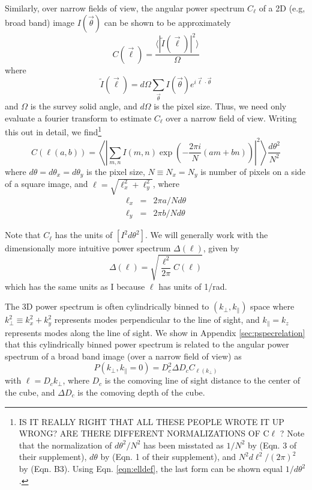 \documentclass{emulateapj}
\begin{document}
Similarly, over narrow fields of view, the angular power spectrum $C_\ell$ of a 2D (e.g, broad band) image $I(\vec{\theta})$ can be shown to be approximately
\begin{equation}
\label{eqn:Cldef0}
	C(\vec{\ell}) = \frac{\langle|\tilde{I}(\vec{\ell})|^2\rangle}{\Omega} 
\end{equation}
where
\begin{equation}
	\tilde{I}(\vec{\ell})=d\Omega\sum_{\vec{\theta}}I(\vec{\theta})e^{i\vec{\ell}\cdot\vec{\theta}}
\end{equation}
and $\Omega$ is the survey solid angle, and $d\Omega$ is the pixel size. Thus, we need only evaluate a fourier transform to estimate $C_\ell$ over a narrow field of view. Writing this out in detail, we find\footnote{IS IT REALLY RIGHT THAT ALL THESE PEOPLE WROTE IT UP WRONG? ARE THERE DIFFERENT NORMALIZATIONS OF C$\ell$ ? Note that the normalization of $d\theta^2/N^2$ has been misstated as $1/N^2$ by \citet{zemcov14} (Eqn. 3 of their supplement), $d\theta$ by \citet{cooray12} (Eqn. 1 of their supplement), and $N^2d\ell^2/(2\pi)^2$ by \citet{thacker15} (Eqn. B3). Using Eqn. \ref{eqn:elldef}, the last form can be shown equal $1/d\theta^2$.} 
\begin{equation}
\label{eqn:Cldef}
	C(\ell(a,b))=\left\langle\left|\sum_{m,n}I(m,n)\exp\left(-\frac{2\pi i}{N}  (am+bn)\right)\right|^2\right\rangle\frac{d\theta^2}{N^2}
\end{equation}
where $d\theta=d\theta_x=d\theta_y$ is the pixel size, $N\equiv N_x=N_y$ is number of pixels on a side of a square image, and $\ell=\sqrt{\ell_x^2+\ell_y^2}$, where 
\begin{eqnarray}
\ell_x&=&2\pi a/N d\theta \label{eqn:elldef}\\
\ell_y&=&2\pi b/Nd\theta \label{eqn:elldef2}
\end{eqnarray}

Note that $C_\ell$ has the units of $[I^2d\theta^2]$. We will generally work with the dimensionally more intuitive power spectrum $\Delta(\ell)$, given by
\begin{equation}
	\Delta(\ell)=\sqrt{\frac{\ell^2}{2\pi}C(\ell)}
\end{equation}
which has the same units as I because $\ell$ has units of 1/rad. 

The 3D power spectrum is often cylindrically binned to $(k_\perp,k_\parallel)$ space where $k_\perp^2\equiv k_x^2+k_y^2$ represents modes perpendicular to the line of sight, and $k_\parallel=k_z$ represents modes along the line of sight. We show in Appendix \ref{sec:pspecrelation}  that this cylindrically binned power spectrum is related to the angular power spectrum of a broad band image (over a narrow field of view) as
\begin{equation}
P(k_\perp,k_\parallel=0)=D_c^2 \Delta D_c C_{\ell(k_\perp)}	
\end{equation}
with $\ell=D_c k_\perp$, where $D_c$ is the comoving line of sight distance to the center of the cube, and $\Delta D_c$ is the comoving depth of the cube.
\end{document}
